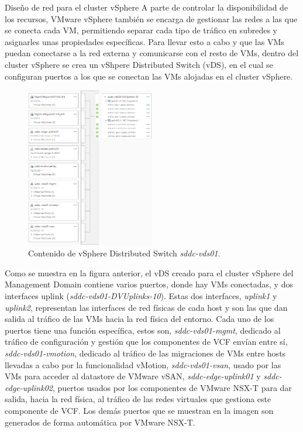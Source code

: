 \begin{subsubsection}{Diseño de red para el cluster vSphere}
  A parte de controlar la disponibilidad de los recursos, VMware vSphere también se encarga de gestionar las redes a las que se conecta cada VM, permitiendo separar cada tipo de tráfico en subredes y asignarles unas propiedades específicas. Para llevar esto a cabo y que las VMs puedan conectarse a la red externa y comunicarse con el resto de VMs, dentro del cluster vSphere se crea un vShpere Distributed Switch (vDS), en el cual se configuran puertos a los que se conectan las VMs alojadas en el cluster vSphere.
  \begin{figure}[h]
    \centering
    \includegraphics[width=0.5\textwidth]{imaxes/pruebaconcepto/distributedSwitchEntornoFinal.png}
    \caption{Contenido de vSphere Distributed Switch \textit{sddc-vds01}.}
    \label{fig:port-groups-vSwitch-vSphere}
  \end{figure}
  \FloatBarrier
  Como se muestra en la figura anterior, el vDS creado para el cluster vSphere del Management Domain contiene varios puertos, donde hay VMs conectadas, y dos interfaces uplink (\textit{sddc-vds01-DVUplinks-10}). Estas dos interfaces, \textit{uplink1} y \textit{uplink2}, representan las interfaces de red físicas de cada host y son las que dan salida al tráfico de las VMs hacia la red física del entorno. Cada uno de los puertos tiene una función específica, estos son, \textit{sddc-vds01-mgmt}, dedicado al tráfico de configuración y gestión que los componentes de VCF envían entre sí, \textit{sddc-vds01-vmotion}, dedicado al tráfico de las migraciones de VMs entre hosts llevadas a cabo por la funcionalidad vMotion, \textit{sddc-vds01-vsan}, usado por las VMs para acceder al datastore de VMware vSAN, \textit{sddc-edge-uplink01} y \textit{sddc-edge-uplink02}, puertos usados por los componentes de VMware NSX-T para dar salida, hacia la red física, al tráfico de las redes virtuales que gestiona este componente de VCF. Los demás puertos que se muestran en la imagen son generados de forma automática por VMware NSX-T.


\end{subsubsection}
